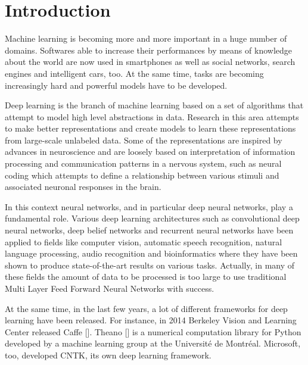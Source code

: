  \chapter{Introduction}\label{ch:introduction}

Machine learning is becoming more and more important in a huge number of domains. Softwares able to increase their performances by means of knowledge about the world are now used in smartphones as well as social networks, search engines and intelligent cars, too. At the same time, tasks are becoming increasingly hard and powerful models have to be developed.

Deep learning is the branch of machine learning based on a set of algorithms that attempt to model high level abstractions in data.
Research in this area attempts to make better representations and create models to learn these representations from large-scale unlabeled data. Some of the representations are inspired by advances in neuroscience and are loosely based on interpretation of information processing and communication patterns in a nervous system, such as neural coding which attempts to define a relationship between various stimuli and associated neuronal responses in the brain.

In this context neural networks, and in particular deep neural networks, play a fundamental role. Various deep learning architectures such as convolutional deep neural networks, deep belief networks and recurrent neural networks have been applied to fields like computer vision, automatic speech recognition, natural language processing, audio recognition and bioinformatics where they have been shown to produce state-of-the-art results on various tasks. Actually, in many of these fields the amount of data to be processed is too large to use traditional Multi Layer Feed Forward Neural Networks with success.

At the same time, in the last few years, a lot of different frameworks for deep learning have been released. For instance, in 2014 Berkeley Vision and Learning Center released Caffe [\cite{jia2014caffe}]. Theano [\cite{2016arXiv160502688full}] is a numerical computation library for Python developed by a machine learning group at the Université de Montréal. Microsoft, too, developed CNTK,  its own deep learning framework.

